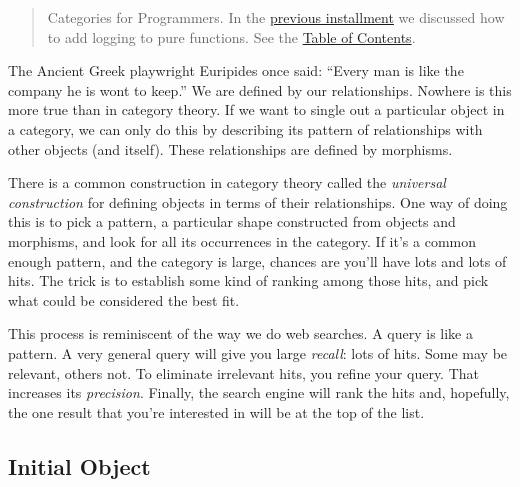 \begin{quote}
Categories for Programmers. In the
\href{https://bartoszmilewski.com/2014/12/23/kleisli-categories/}{previous
installment} we discussed how to add logging to pure functions. See the
\href{https://bartoszmilewski.com/2014/10/28/category-theory-for-programmers-the-preface/}{Table
of Contents}.
\end{quote}

The Ancient Greek playwright Euripides once said: ``Every man is like
the company he is wont to keep.'' We are defined by our relationships.
Nowhere is this more true than in category theory. If we want to single
out a particular object in a category, we can only do this by describing
its pattern of relationships with other objects (and itself). These
relationships are defined by morphisms.

There is a common construction in category theory called the
\emph{universal construction} for defining objects in terms of their
relationships. One way of doing this is to pick a pattern, a particular
shape constructed from objects and morphisms, and look for all its
occurrences in the category. If it's a common enough pattern, and the
category is large, chances are you'll have lots and lots of hits. The
trick is to establish some kind of ranking among those hits, and pick
what could be considered the best fit.

This process is reminiscent of the way we do web searches. A query is
like a pattern. A very general query will give you large \emph{recall}:
lots of hits. Some may be relevant, others not. To eliminate irrelevant
hits, you refine your query. That increases its \emph{precision}.
Finally, the search engine will rank the hits and, hopefully, the one
result that you're interested in will be at the top of the list.

\subsection{Initial Object}\label{initial-object}

